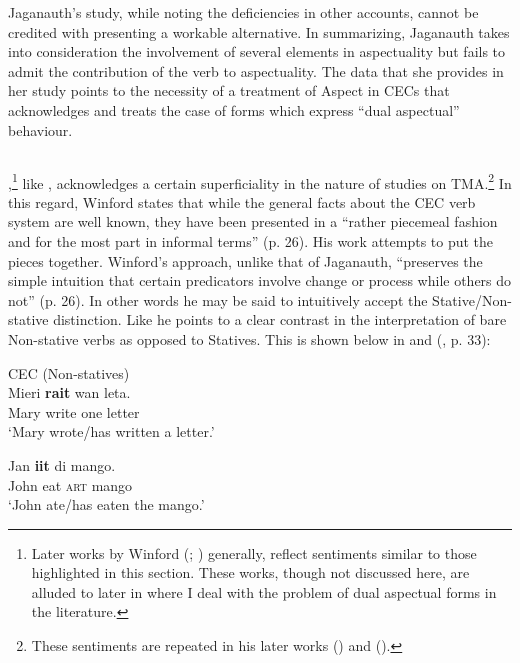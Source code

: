 Jaganauth’s study, while noting the deficiencies in other accounts,
cannot be credited with presenting a workable alternative.  In
summarizing, Jaganauth takes into consideration the involvement of
several elements in aspectuality but fails to admit the contribution
of the verb to aspectuality.  The data that she provides in her study
points to the necessity of a treatment of Aspect in CECs that
acknowledges and treats the case of forms which express ``dual
aspectual'' behaviour.

\subsection{\citet{Winford1993}}\label{sec:2.1.5}

\citet{Winford1993},\footnote{Later works by Winford (\citeyear{Winford1997};
  \citet{Winford2000}) generally, reflect sentiments similar to those highlighted
  in this section. These works, though not discussed here, are alluded
  to later in  where I deal with the problem of dual
  aspectual forms in the literature.}  like \citet{Jaganauth1987}, acknowledges a
certain superficiality in the nature of studies on TMA.\footnote{These
  sentiments are repeated in his later works (\citeyear{Winford1997}) and (\citeyear{Winford2000}).}
  In this regard, Winford states that while the general facts about the CEC
verb system are well known, they have been presented in a “rather
piecemeal fashion and for the most part in informal terms” (p. 26).
His work attempts to put the pieces together.  Winford’s approach,
unlike that of Jaganauth, “preserves the simple intuition that certain
predicators involve change or process while others do not” (p. 26). In
other words he may be said to intuitively accept the
Stative\slash Non-stative distinction.  Like \citet{Bickerton1975,Bickerton1981} he
points to a clear contrast in the interpretation of bare Non-stative
verbs as opposed to Statives. This is shown below in  and
 (\citealt{Winford1993}, p. 33):

\ea%
\label{ex:2:15}
CEC (Non-statives) \\
\ea
\gll Mieri \textbf{rait} wan leta.\\
		Mary write one letter\\
\glt `Mary wrote/has written a letter.'

\ex
\gll Jan \textbf{iit} di mango.\\
		John eat \textsc{art} mango\\
\glt `John ate/has eaten the mango.' \z \z

